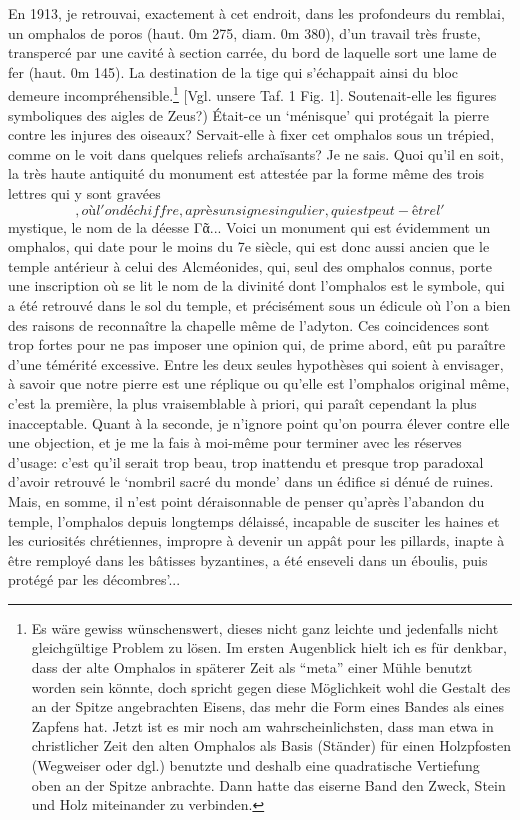 \documentclass[a4paper, 11pt, oneside]{article}
\newcommand*\svgAAA{}
\newcommand*\svgAAB{}
\begin{document}
En 1913, je retrouvai, exactement à cet endroit, dans les profondeurs du remblai, un omphalos de poros (haut. 0m 275, diam. 0m 380), d'un travail très fruste, transpercé par une cavité à section carrée, du bord de laquelle sort une lame de fer (haut. 0m 145). La destination de la tige qui s'échappait ainsi du bloc demeure incompréhensible.\footnote{Es wäre gewiss wünschenswert, dieses nicht ganz leichte und jedenfalls nicht gleichgültige Problem zu lösen. Im ersten Augenblick hielt ich es für denkbar, dass der alte Omphalos in späterer Zeit als "`meta"' einer Mühle benutzt worden sein könnte, doch spricht gegen diese Möglichkeit wohl die Gestalt des an der Spitze angebrachten Eisens, das mehr die Form eines Bandes als eines Zapfens hat. Jetzt ist es mir noch am wahrscheinlichsten, dass man etwa in christlicher Zeit den alten Omphalos als Basis (Ständer) für einen Holzpfosten (Wegweiser oder dgl.) benutzte und deshalb eine quadratische Vertiefung oben an der Spitze anbrachte. Dann hatte das eiserne Band den Zweck, Stein und Holz miteinander zu verbinden.} [Vgl. unsere Taf. 1 Fig. 1]. Soutenait-elle les figures symboliques des aigles de Zeus?) Était-ce un `ménisque' qui protégait la pierre contre les injures des oiseaux? Servait-elle à fixer cet omphalos sous un trépied, comme on le voit dans quelques reliefs archaïsants? Je ne sais. Quoi qu'il en soit, la très haute antiquité du monument est attestée par la forme même des trois lettres qui y sont gravées $\svgAAA$, où l'on déchiffre, après un signe singulier, qui est peut-être l'$\svgAAB$ mystique, le nom de la déesse Γᾶ... Voici un monument qui est évidemment un omphalos, qui date pour le moins du 7e siècle, qui est donc aussi ancien que le temple antérieur à celui des Alcméonides, qui, seul des omphalos connus, porte une inscription où se lit le nom de la divinité dont l'omphalos est le symbole, qui a été retrouvé dans le sol du temple, et précisément sous un édicule où l'on a bien des raisons de reconnaître la chapelle même de l'adyton. Ces coincidences sont trop fortes pour ne pas imposer une opinion qui, de prime abord, eût pu paraître d'une témérité excessive. Entre les deux seules hypothèses qui soient à envisager, à savoir que notre pierre est une réplique ou qu'elle est l'omphalos original même, c'est la première, la plus vraisemblable à priori, qui paraît cependant la plus inacceptable. Quant à la seconde, je n'ignore point qu'on pourra élever contre elle une objection, et je me la fais à moi-même pour terminer avec les réserves d'usage: c'est qu'il serait trop beau, trop inattendu et presque trop paradoxal d'avoir retrouvé le `nombril sacré du monde' dans un édifice si dénué de ruines. Mais, en somme, il n'est point déraisonnable de penser qu'après l'abandon du temple, l'omphalos depuis longtemps délaissé, incapable de susciter les haines et les curiosités chrétiennes, impropre à devenir un appât pour les pillards, inapte à être remployé dans les bâtisses byzantines, a été enseveli dans un éboulis, puis protégé par les décombres'...
\end{document}
